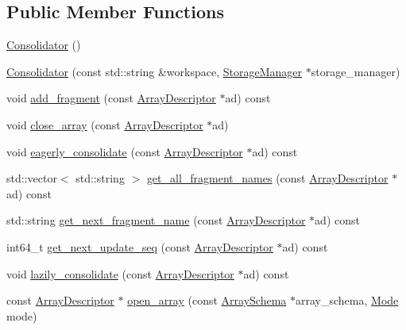 \subsection*{Public Member Functions}
\begin{DoxyCompactItemize}
\item 
\hyperlink{classConsolidator_ab5bbc14d22544aeb8fd658d727b0a83d}{Consolidator} ()
\item 
\hyperlink{classConsolidator_ae43ad1f95cc2a5f4213ae0ce39000bfb}{Consolidator} (const std\+::string \&workspace, \hyperlink{classStorageManager}{Storage\+Manager} $\ast$storage\+\_\+manager)
\item 
void \hyperlink{classConsolidator_a6cc440cad5930f304e6d1eb9d59a4a8d}{add\+\_\+fragment} (const \hyperlink{classConsolidator_1_1ArrayDescriptor}{Array\+Descriptor} $\ast$ad) const 
\item 
void \hyperlink{classConsolidator_a53574b38184c4de9915a0c5912a473cc}{close\+\_\+array} (const \hyperlink{classConsolidator_1_1ArrayDescriptor}{Array\+Descriptor} $\ast$ad)
\item 
void \hyperlink{classConsolidator_a258a82dbcba2aee5b833892aa352ebe5}{eagerly\+\_\+consolidate} (const \hyperlink{classConsolidator_1_1ArrayDescriptor}{Array\+Descriptor} $\ast$ad) const 
\item 
std\+::vector$<$ std\+::string $>$ \hyperlink{classConsolidator_aa5b25db379ea33e4cd428d6bf04fde78}{get\+\_\+all\+\_\+fragment\+\_\+names} (const \hyperlink{classConsolidator_1_1ArrayDescriptor}{Array\+Descriptor} $\ast$ad) const 
\item 
std\+::string \hyperlink{classConsolidator_abce80241d142f3b160ac6289ed09da59}{get\+\_\+next\+\_\+fragment\+\_\+name} (const \hyperlink{classConsolidator_1_1ArrayDescriptor}{Array\+Descriptor} $\ast$ad) const 
\item 
int64\+\_\+t \hyperlink{classConsolidator_ab2530af27e9cd8d13285591f18a9da24}{get\+\_\+next\+\_\+update\+\_\+seq} (const \hyperlink{classConsolidator_1_1ArrayDescriptor}{Array\+Descriptor} $\ast$ad) const 
\item 
void \hyperlink{classConsolidator_a66b77f07f3db50c295a89053cbca909f}{lazily\+\_\+consolidate} (const \hyperlink{classConsolidator_1_1ArrayDescriptor}{Array\+Descriptor} $\ast$ad) const 
\item 
const \hyperlink{classConsolidator_1_1ArrayDescriptor}{Array\+Descriptor} $\ast$ \hyperlink{classConsolidator_afce022da3083ef724772deda811d8924}{open\+\_\+array} (const \hyperlink{classArraySchema}{Array\+Schema} $\ast$array\+\_\+schema, \hyperlink{classConsolidator_abb45365555fb0f3aeca0f933027ca54d}{Mode} mode)
\end{DoxyCompactItemize}
